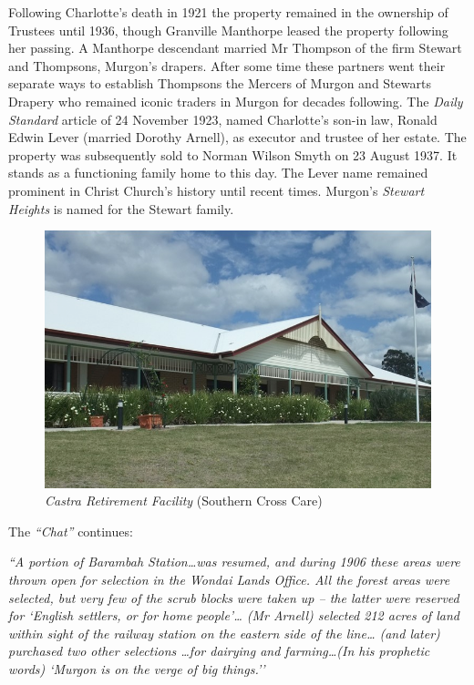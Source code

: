Following Charlotte's death in 1921 the property remained in the ownership of Trustees until 1936, though Granville Manthorpe leased the property following her passing. A Manthorpe descendant married Mr Thompson of the firm Stewart and Thompsons, Murgon's drapers. After some time these partners went their separate ways to establish Thompsons the Mercers of Murgon and Stewarts Drapery who remained iconic traders in Murgon for decades following. The \emph{Daily Standard} article of 24 November 1923, named Charlotte's son-in law, Ronald Edwin Lever (married Dorothy Arnell), as executor and trustee of her estate. The property was subsequently sold to Norman Wilson Smyth on 23 August 1937. It stands as a functioning family home to this day. The Lever name remained prominent in Christ Church's history until recent times. Murgon's \emph{Stewart Heights} is named for the Stewart family.









\begin{figure}[!htb]
\begin{center}
\includegraphics[width=1.\textwidth,center]{../images/castraToday.png}
\caption{{\itshape Castra Retirement Facility} {\scriptsize(Southern Cross Care)}}
\end{center}
\end{figure}




The \emph{``Chat''} continues:



\emph{``A portion of Barambah Station\ldots was resumed, and during 1906 these areas were thrown open for selection in the Wondai Lands Office. All the forest areas were selected, but very few of the scrub blocks were taken up -- the latter were reserved for `English settlers, or for home people'\ldots{} (Mr Arnell) selected 212 acres of land within sight of the railway station on the eastern side of the line\ldots{} (and later) purchased two other selections \ldots for dairying and farming\ldots(In his prophetic words) `Murgon is on the verge of big things.''}



